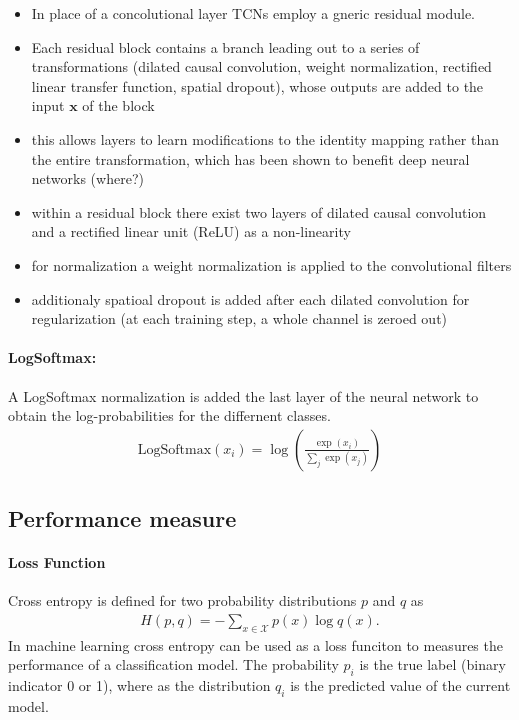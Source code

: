 \documentclass{article}
\begin{document}
\begin{itemize}
\item In place of a concolutional layer TCNs employ a gneric residual module. 
\item Each residual block contains a branch leading out to a series of transformations (dilated causal convolution, weight normalization, rectified linear transfer function, spatial dropout), whose outputs are added to the input $\mathbf x$ of the block
\item this allows layers to learn modifications to the identity mapping rather than the entire transformation, which has been shown to benefit deep neural networks (where?)
\item within a residual block there exist two layers of dilated causal convolution and a rectified linear unit (ReLU) \cite[Nair2010]{Nair2010} as a non-linearity
\item for normalization a weight normalization \cite[Salimans2016]{Salimans2016} is applied to the convolutional filters 
\item additionaly spatioal dropout \cite[Srivastava2014]{Srivastava2014} is added after each dilated convolution for regularization (at each training step, a whole channel is zeroed out)
\end{itemize}




\paragraph{LogSoftmax:}

A LogSoftmax normalization is added the last layer of the neural network to obtain the log-probabilities for the differnent classes.
\begin{align}
\text{LogSoftmax}(x_i) = \log\left(\frac{\exp{(x_i)}}{\sum_j \exp(x_j)}\right)
\end{align} 



\subsection{Performance measure}

\paragraph{Loss Function}
Cross entropy is defined for two probability distributions $p$ and $q$ as
\begin{align}
H(p,q) = - \sum_{x \in \mathcal X} p(x) \log q(x).
\end{align} 
In machine learning cross entropy can be used as a loss funciton to measures the performance of a classification model. The probability $p_{i}$ is the true label (binary indicator 0 or 1), where as the distribution $q_{i}$ is the predicted value of the current model. 
\end{document}
